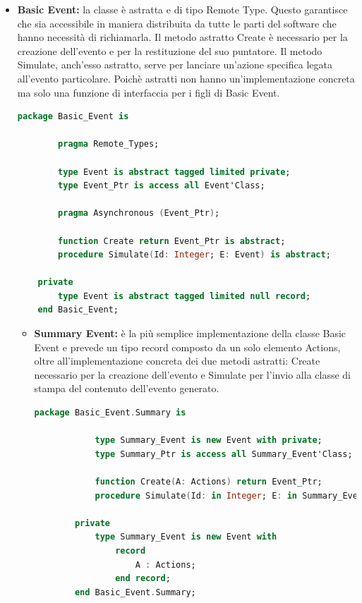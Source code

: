 \documentclass[aps,letterpaper,10pt]{article}
\begin{document}
\begin{itemize}
\item \textbf{Basic Event:} la classe \`e astratta e di tipo Remote Type. Questo garantisce che sia accessibile in
maniera distribuita da tutte le parti del software che hanno necessit\`a di richiamarla. Il metodo astratto Create \`e
necessario per la creazione dell'evento e per la restituzione del suo puntatore. Il metodo Simulate, anch'esso astratto,
serve per lanciare un'azione specifica legata all'evento particolare. Poich\`e astratti non hanno un'implementazione
concreta ma solo una funzione di interfaccia per i figli di Basic Event.
	
	\begin{lstlisting}[language=Ada]
	package Basic_Event is
    
		pragma Remote_Types;
		
		type Event is abstract tagged limited private;
		type Event_Ptr is access all Event'Class;

		pragma Asynchronous (Event_Ptr);

		function Create return Event_Ptr is abstract;
	    procedure Simulate(Id: Integer; E: Event) is abstract;
	
	private
	    type Event is abstract tagged limited null record;
	end Basic_Event;
	\end{lstlisting}
	
	\begin{itemize}
\item \textbf{Summary Event:} \`e la pi\`u semplice implementazione della classe Basic Event e prevede un tipo record
composto da un solo elemento Actions, oltre all'implementazione concreta dei due metodi astratti: Create necessario per
la creazione dell'evento e Simulate per l'invio alla classe di stampa del contenuto dell'evento generato.
		
		\begin{lstlisting}[language=Ada]
		package Basic_Event.Summary is
    
			type Summary_Event is new Event with private; 
		    type Summary_Ptr is access all Summary_Event'Class;
	
		    function Create(A: Actions) return Event_Ptr; 
		    procedure Simulate(Id: in Integer; E: in Summary_Event);
		
		private
		    type Summary_Event is new Event with
		        record 
			        A : Actions;
		        end record;
		end Basic_Event.Summary;
		\end{lstlisting}
		

\end{itemize}
\end{itemize}
\end{document}
